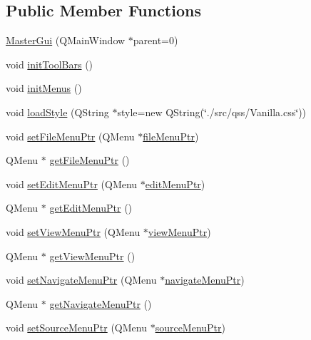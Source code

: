 \subsection*{Public Member Functions}
\begin{DoxyCompactItemize}
\item 
\hyperlink{class_master_gui_a9d3221a5d6791ffab353e038452e8b79}{Master\-Gui} (Q\-Main\-Window $\ast$parent=0)
\item 
void \hyperlink{class_master_gui_aa8cb5efc03f304d4a80d0d743a30e5b3}{init\-Tool\-Bars} ()
\item 
void \hyperlink{class_master_gui_a65f7212a54b92bdd21498478b9689631}{init\-Menus} ()
\item 
void \hyperlink{class_master_gui_a266df8320dd219d029630f4439c8ceca}{load\-Style} (Q\-String $\ast$style=new Q\-String(\char`\"{}./src/qss/Vanilla.\-css\char`\"{}))
\item 
void \hyperlink{class_master_gui_a4ee6b41a4beb5adfd5c2c15e2490384e}{set\-File\-Menu\-Ptr} (Q\-Menu $\ast$\hyperlink{class_master_gui_a1d768ad74ddb657928df8539c356abb6}{file\-Menu\-Ptr})
\item 
Q\-Menu $\ast$ \hyperlink{class_master_gui_a91a38d0a69249c1f2d6a6175e9fb5342}{get\-File\-Menu\-Ptr} ()
\item 
void \hyperlink{class_master_gui_a91cccfac6fdcd723b4d127a0a668adc7}{set\-Edit\-Menu\-Ptr} (Q\-Menu $\ast$\hyperlink{class_master_gui_aeb708f257518fb47d567d1130bfc7f7f}{edit\-Menu\-Ptr})
\item 
Q\-Menu $\ast$ \hyperlink{class_master_gui_a50196fb1473d723bc940c54879ef6388}{get\-Edit\-Menu\-Ptr} ()
\item 
void \hyperlink{class_master_gui_a4a18f80bfecff6ff5bae16721044dcac}{set\-View\-Menu\-Ptr} (Q\-Menu $\ast$\hyperlink{class_master_gui_acb6a42ddb59a05f60ab7aa2a9fdddbc8}{view\-Menu\-Ptr})
\item 
Q\-Menu $\ast$ \hyperlink{class_master_gui_a3fb03d1a102443e480594a5823917e1a}{get\-View\-Menu\-Ptr} ()
\item 
void \hyperlink{class_master_gui_a2479e3fe7c83858e517855dededf2c51}{set\-Navigate\-Menu\-Ptr} (Q\-Menu $\ast$\hyperlink{class_master_gui_aec75bd894b1c0eecea35c67ecdfcf1b0}{navigate\-Menu\-Ptr})
\item 
Q\-Menu $\ast$ \hyperlink{class_master_gui_a72fd20d98b2d2754fe37beb40e4f5bc6}{get\-Navigate\-Menu\-Ptr} ()
\item 
void \hyperlink{class_master_gui_a58264652e48e97b3313819f0f67bb19e}{set\-Source\-Menu\-Ptr} (Q\-Menu $\ast$\hyperlink{class_master_gui_a3ffd8337f87c7c6eca6b4740fa8d1c57}{source\-Menu\-Ptr})

\end{DoxyCompactItemize}
